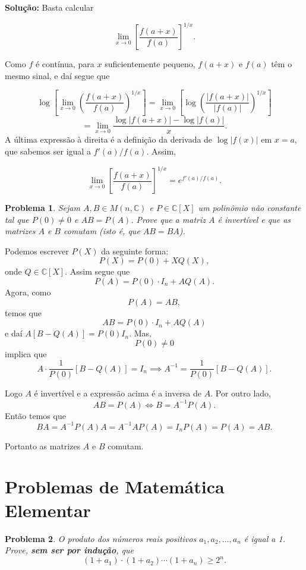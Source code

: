 \documentclass{hipatia}
\newtheorem{problem*}{Problema}
\newenvironment{sola}{\noindent \textbf{Solução:}}{}
\begin{document}
\begin{sola}
Basta calcular

\[
\lim_{x \to 0} \left[ \frac{f(a + x)}{f(a)} \right]^{1/x}.
\]

\noindent Como $f$ é contínua, para \( x \) suficientemente pequeno, \( f(a + x) \) e \( f(a) \) têm o mesmo sinal, e daí segue que

$$\log \left[ \lim_{x \to 0} \left( \frac{f(a + x)}{f(a)} \right)^{1/x} \right]
 =  \lim_{x \to 0} \left[ \log \left( \frac{|f(a + x)|}{|f(a)|} \right)^{1/x} \right]$$
$$ =  \lim_{x \to 0} \frac{\log |f(a + x)| - \log |f(a)|}{x}.$$
A última expressão à direita é a definição da derivada de \( \log |f(x)| \) em \( x = a \), que sabemos ser igual a \( f'(a)/f(a) \). Assim,

\[
\lim_{x \to 0} \left[ \frac{f(a + x)}{f(a)} \right]^{1/x} = e^{f'(a)/f(a)}.
\]
\end{sola}






\begin{problem*}
Sejam $A, B \in M(n, \mathbb{C})$ e $P \in \mathbb{C}[X]$ um polinômio não constante tal que $P(0) \neq 0$ e $A B=P(A)$. Prove que a matriz $A$ é invertível e que as matrizes $A$ e $B$ comutam (isto é, que $AB=BA$).
\end{problem*}

 Podemos escrever \( P(X) \) da seguinte forma:
\[
P(X) = P(0) + XQ(X),
\]
onde \( Q \in \mathbb{C}[X] \). Assim segue que
\[
P(A) = P(0) \cdot I_n + AQ(A).
\]
Agora, como \[P(A) = AB, \] temos que \[
AB = P(0) \cdot I_n + AQ(A)\]  e daí $A[B - Q(A)] = P(0)I_n.$
Mas,
\[
P(0) \neq 0
\]
implica que
\[
A \cdot \frac{1}{P(0)}[B - Q(A)] = I_n \implies A^{-1} = \frac{1}{P(0)}[B - Q(A)].
\]

\noindent Logo \( A \) é invertível e a expressão acima é a inversa de \( A \). Por outro lado, \[AB = P(A) \iff B = A^{-1}P(A).\]
Então temos que
\[
BA = A^{-1}P(A)A = A^{-1}AP(A) = I_nP(A) = P(A) = AB.
\]

\noindent Portanto as matrizes \( A \) e \( B \) comutam.




\section{Problemas de Matemática Elementar}

\begin{problem*} O produto dos números reais positivos $a_1, a_2, \ldots, a_n$ é igual a 1. Prove, \textbf{sem ser por indução}, que $$(1+a_1)\cdot(1+a_2)\cdots (1+a_n) \geq 2^n.$$  

\end{problem*}
\end{document}
